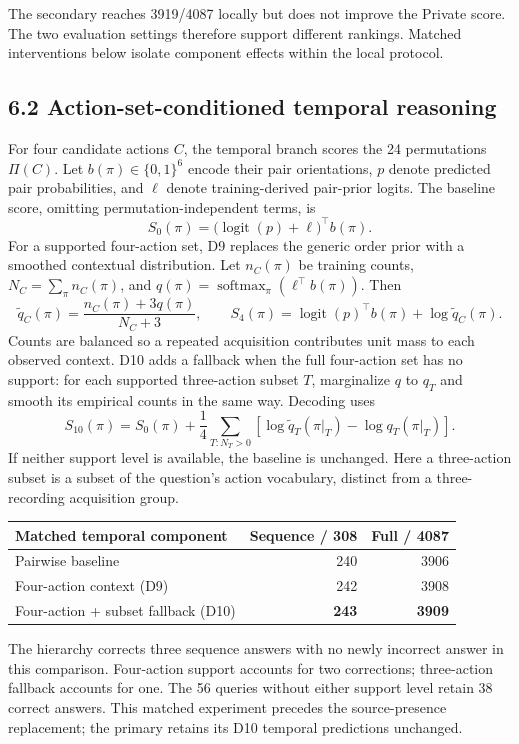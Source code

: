 \documentclass[12pt,a4paper]{article}
\begin{document}
The secondary reaches 3919/4087 locally but does not improve the Private score. The two evaluation settings therefore support different rankings. Matched interventions below isolate component effects within the local protocol.

\subsection*{6.2 Action-set-conditioned temporal reasoning}
For four candidate actions $C$, the temporal branch scores the 24 permutations $\Pi(C)$. Let $b(\pi)\in\{0,1\}^6$ encode their pair orientations, $p$ denote predicted pair probabilities, and $\ell$ denote training-derived pair-prior logits. The baseline score, omitting permutation-independent terms, is
\[
S_0(\pi)=\bigl(\operatorname{logit}(p)+\ell\bigr)^\top b(\pi).
\]
For a supported four-action set, D9 replaces the generic order prior with a smoothed contextual distribution. Let $n_C(\pi)$ be training counts, $N_C=\sum_\pi n_C(\pi)$, and $q(\pi)=\operatorname{softmax}_{\pi}(\ell^\top b(\pi))$. Then
\[
\widetilde q_C(\pi)=\frac{n_C(\pi)+3q(\pi)}{N_C+3},\qquad
S_4(\pi)=\operatorname{logit}(p)^\top b(\pi)+\log\widetilde q_C(\pi).
\]
Counts are balanced so a repeated acquisition contributes unit mass to each observed context. D10 adds a fallback when the full four-action set has no support: for each supported three-action subset $T$, marginalize $q$ to $q_T$ and smooth its empirical counts in the same way. Decoding uses
\[
S_{10}(\pi)=S_0(\pi)+\frac14\sum_{T:N_T>0}
\left[\log\widetilde q_T(\pi|_T)-\log q_T(\pi|_T)\right].
\]
If neither support level is available, the baseline is unchanged. Here a three-action subset is a subset of the question's action vocabulary, distinct from a three-recording acquisition group.

\begin{tabularx}{\linewidth}{@{}Yrr@{}}
\toprule
Matched temporal component & Sequence / 308 & Full / 4087\\
\midrule
Pairwise baseline & 240 & 3906\\
Four-action context (D9) & 242 & 3908\\
Four-action + subset fallback (D10) & \textbf{243} & \textbf{3909}\\
\bottomrule
\end{tabularx}

The hierarchy corrects three sequence answers with no newly incorrect answer in this comparison. Four-action support accounts for two corrections; three-action fallback accounts for one. The 56 queries without either support level retain 38 correct answers. This matched experiment precedes the source-presence replacement; the primary retains its D10 temporal predictions unchanged.
\end{document}
